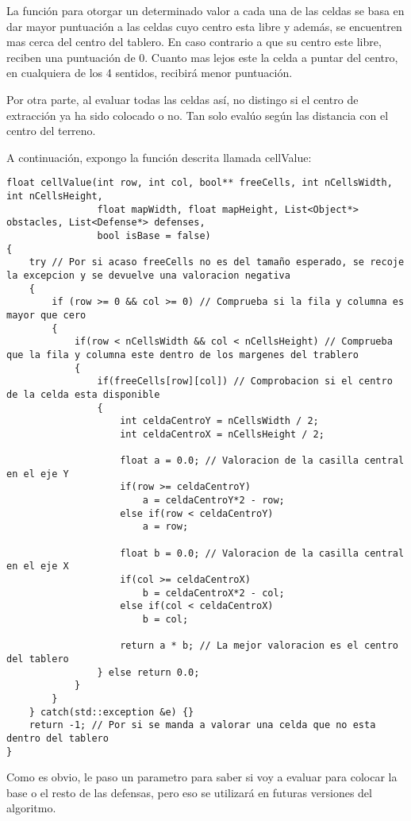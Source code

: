 La función para otorgar un determinado valor a cada una de las
celdas se basa en dar mayor puntuación a las celdas cuyo centro
esta libre y además, se encuentren mas cerca del centro del
tablero. En caso contrario a que su centro este libre, reciben
una puntuación de 0. Cuanto mas lejos este la celda a puntar
del centro, en cualquiera de los 4 sentidos, recibirá menor
puntuación.

Por otra parte, al evaluar todas las celdas así, no distingo
si el centro de extracción ya ha sido colocado o no. Tan solo
evalúo según las distancia con el centro del terreno.

A continuación, expongo la función descrita llamada cellValue:

\lstset{language=C++, texcl=true}
\begin{lstlisting}[frame=single]
float cellValue(int row, int col, bool** freeCells, int nCellsWidth, int nCellsHeight,
                float mapWidth, float mapHeight, List<Object*> obstacles, List<Defense*> defenses,
                bool isBase = false)
{
    try // Por si acaso freeCells no es del tamaño esperado, se recoje la excepcion y se devuelve una valoracion negativa
    {
        if (row >= 0 && col >= 0) // Comprueba si la fila y columna es mayor que cero
        {
            if(row < nCellsWidth && col < nCellsHeight) // Comprueba que la fila y columna este dentro de los margenes del trablero
            {
                if(freeCells[row][col]) // Comprobacion si el centro de la celda esta disponible
                {
                    int celdaCentroY = nCellsWidth / 2;
                    int celdaCentroX = nCellsHeight / 2;

                    float a = 0.0; // Valoracion de la casilla central en el eje Y
                    if(row >= celdaCentroY)
                        a = celdaCentroY*2 - row;
                    else if(row < celdaCentroY)
                        a = row;

                    float b = 0.0; // Valoracion de la casilla central en el eje X
                    if(col >= celdaCentroX)
                        b = celdaCentroX*2 - col;
                    else if(col < celdaCentroX)
                        b = col;

                    return a * b; // La mejor valoracion es el centro del tablero
                } else return 0.0;
            }
        }
    } catch(std::exception &e) {}
    return -1; // Por si se manda a valorar una celda que no esta dentro del tablero
}
\end{lstlisting}

Como es obvio, le paso un parametro para saber si voy a evaluar para colocar la base
o el resto de las defensas, pero eso se utilizará en futuras versiones del algoritmo.
